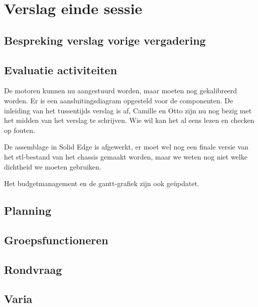 \documentclass[a4paper,kulak]{kulakarticle} %
\begin{document}
\section{Verslag einde sessie}

\subsection{Bespreking verslag vorige vergadering}

\subsection{Evaluatie activiteiten}
De motoren kunnen nu aangestuurd worden, maar moeten nog gekalibreerd worden. Er is een aansluitingsdiagram opgesteld voor de componenten. De inleiding van het tussentijds verslag is af, Camille en Otto zijn nu nog bezig met het midden van het verslag te schrijven. Wie wil kan het al eens lezen en checken op fouten.

De assemblage in Solid Edge is afgewerkt, er moet wel nog een finale versie van het stl-bestand van het chassis gemaakt worden, maar we weten nog niet welke dichtheid we moeten gebruiken.

Het budgetmanagement en de gantt-grafiek zijn ook geüpdatet.

\subsection{Planning}

\subsection{Groepsfunctioneren}

\subsection{Rondvraag}

\subsection{Varia}
\end{document}
